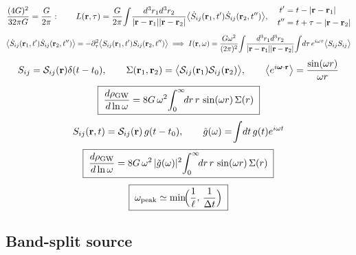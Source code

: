 \documentclass[10pt,prd,aps,nobibnotes,superscriptaddress,preprintnumbers,notitlepage]{revtex4-1}
\def \pa{\partial}
\newcommand{\br}{{\bf r}}
\begin{document}
\begin{equation}
  \frac{(4G)^2}{32\pi G}=\frac{G}{2\pi}:
  \qquad
  L(\br,\tau)=\frac{G}{2\pi}\!\int\!\frac{d^3r_1d^3r_2}{|\br-\br_1||\br-\br_2|}
  \bigl\langle\dot S_{ij}(\br_1,t')\dot S_{ij}(\br_2,t'')\bigr\rangle,
  \quad
  \begin{aligned}
    t'&=t-|\br-\br_1|\\
    t''&=t+\tau-|\br-\br_2|
  \end{aligned}
  \label{A:rsLret}
\end{equation}
\begin{equation}
  \bigl\langle\dot S_{ij}(\br_1,t')\dot S_{ij}(\br_2,t'')\bigr\rangle
  =-\pa_\tau^2\bigl\langle S_{ij}(\br_1,t')S_{ij}(\br_2,t'')\bigr\rangle
  \;\Longrightarrow\;
  I(\br,\omega)=\frac{G\omega^2}{(2\pi)^2}\!\int\!\frac{d^3r_1d^3r_2}{|\br-\br_1||\br-\br_2|}
  \!\int\!d\tau\,e^{i\omega\tau}\bigl\langle S_{ij}S_{ij}\bigr\rangle
  \label{A:rsIw}
\end{equation}
\begin{equation}
  S_{ij}=\mathcal{S}_{ij}(\br)\delta(t-t_0),
  \qquad
  \Sigma(\br_1,\br_2)=\bigl\langle\mathcal{S}_{ij}(\br_1)\mathcal{S}_{ij}(\br_2)\bigr\rangle,
  \qquad
  \bigl\langle e^{i\boldsymbol{\omega}\cdot\br}\bigr\rangle=\frac{\sin(\omega r)}{\omega r}
  \label{A:rsburst}
\end{equation}
\begin{equation}
  \boxed{\;
  \frac{d\rho_{\rm GW}}{d\ln\omega}=8G\,\omega^2\!\int_0^{\infty}\!\!dr\,r\,\sin(\omega r)\,\Sigma(r)\;}
  \label{A:rsspectrum}
\end{equation}
\begin{equation}
  S_{ij}(\br,t)=\mathcal{S}_{ij}(\br)\,g(t-t_0),
  \qquad
  \tilde g(\omega)=\!\int\!dt\,g(t)e^{i\omega t}
  \label{A:rsg}
\end{equation}
\begin{equation}
  \boxed{\;
  \frac{d\rho_{\rm GW}}{d\ln\omega}=8G\,\omega^2\,|\tilde g(\omega)|^2\!
  \int_0^{\infty}\!\!dr\,r\,\sin(\omega r)\,\Sigma(r)\;}
  \label{A:rsspectrumdt}
\end{equation}
\begin{equation}
  \boxed{\;\omega_{\rm peak}\simeq\min\!\Bigl(\frac{1}{\ell},\,\frac{1}{\Delta t}\Bigr)\;}
  \label{A:rsfpeak}
\end{equation}


\subsection{Band-split source}
\label{sec:chain-bandsplit}
\end{document}
